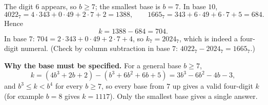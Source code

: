 The digit $6$ appears, so $b\ge7$; the smallest base is $b=7$. In base $10$,
\[
4022_7=4\cdot343+0\cdot49+2\cdot7+2=1388,\qquad 1665_7=343+6\cdot49+6\cdot7+5=684 .
\]
Hence
\[
k=1388-684=\boxed{704}.
\]
In base $7$: $704=2\cdot343+0\cdot49+2\cdot7+4$, so $k_7=2024_7$, which is indeed a four-digit numeral. (Check by column subtraction in base $7$: $4022_7-2024_7=1665_7$.)

\textbf{Why the base must be specified.} For a general base $b\ge7$,
\[
k=(4b^3+2b+2)-(b^3+6b^2+6b+5)=3b^3-6b^2-4b-3,
\]
and $b^3\le k<b^4$ for every $b\ge7$, so every base from $7$ up gives a valid four-digit $k$ (for example $b=8$ gives $k=1117$). Only the smallest base gives a single answer.

